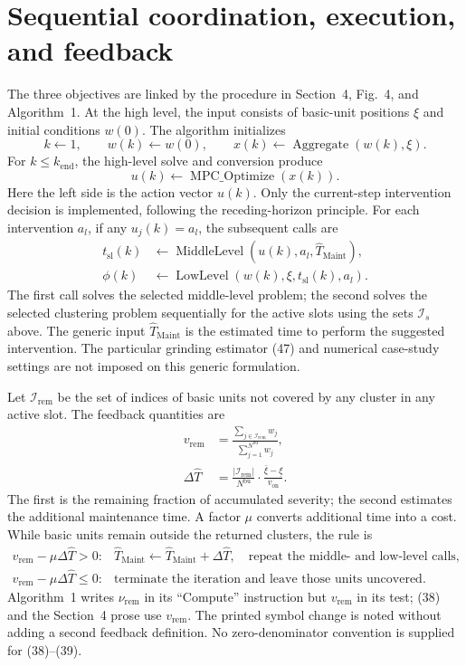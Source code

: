 \documentclass{article}
\begin{document}
\section*{Sequential coordination, execution, and feedback}
The three objectives are linked by the procedure in Section~4, Fig.~4, and Algorithm~1. At the high level, the input consists of basic-unit positions $\xi$ and initial conditions $w(0)$. The algorithm initializes
\[
k\leftarrow1,\qquad w(k)\leftarrow w(0),\qquad
x(k)\leftarrow\operatorname{Aggregate}(w(k),\xi).
\]
For $k\leq k_{\mathrm{end}}$, the high-level solve and conversion produce
\[
u(k)\leftarrow\operatorname{MPC\_Optimize}(x(k)).
\]
Here the left side is the action vector $u(k)$. Only the current-step intervention decision is implemented, following the receding-horizon principle. For each intervention $a_l$, if any $u_j(k)=a_l$, the subsequent calls are
\[
\begin{aligned}
t_{\mathrm{sl}}(k)&\leftarrow\operatorname{MiddleLevel}(u(k),a_l,\widehat T_{\mathrm{Maint}}),\\
\phi(k)&\leftarrow\operatorname{LowLevel}(w(k),\xi,t_{\mathrm{sl}}(k),a_l).
\end{aligned}
\]
The first call solves the selected middle-level problem; the second solves the selected clustering problem sequentially for the active slots using the sets $\mathcal I_s$ above. The generic input $\widehat T_{\mathrm{Maint}}$ is the estimated time to perform the suggested intervention. The particular grinding estimator (47) and numerical case-study settings are not imposed on this generic formulation.

Let $\mathcal I_{\mathrm{rem}}$ be the set of indices of basic units not covered by any cluster in any active slot. The feedback quantities are
\begin{align}
v_{\mathrm{rem}}&=
\frac{\displaystyle\sum_{j\in\mathcal I_{\mathrm{rem}}}w_j}
{\displaystyle\sum_{j=1}^{N^{\mathrm{bu}}}w_j}, \tag{38}\\
\Delta\widehat T&=
\frac{|\mathcal I_{\mathrm{rem}}|}{N^{\mathrm{bu}}}
\cdot\frac{\bar\xi-\underline\xi}{v_{\mathrm{on}}}. \tag{39}
\end{align}
The first is the remaining fraction of accumulated severity; the second estimates the additional maintenance time. A factor $\mu$ converts additional time into a cost. While basic units remain outside the returned clusters, the rule is
\[
\begin{array}{ll}
v_{\mathrm{rem}}-\mu\Delta\widehat T>0:
&\widehat T_{\mathrm{Maint}}\leftarrow\widehat T_{\mathrm{Maint}}+\Delta\widehat T,
\quad\text{repeat the middle- and low-level calls},\\[2pt]
v_{\mathrm{rem}}-\mu\Delta\widehat T\leq0:
&\text{terminate the iteration and leave those units uncovered}.
\end{array}
\]
Algorithm~1 writes $\nu_{\mathrm{rem}}$ in its ``Compute'' instruction but $v_{\mathrm{rem}}$ in its test; (38) and the Section~4 prose use $v_{\mathrm{rem}}$. The printed symbol change is noted without adding a second feedback definition. No zero-denominator convention is supplied for (38)--(39).
\end{document}
